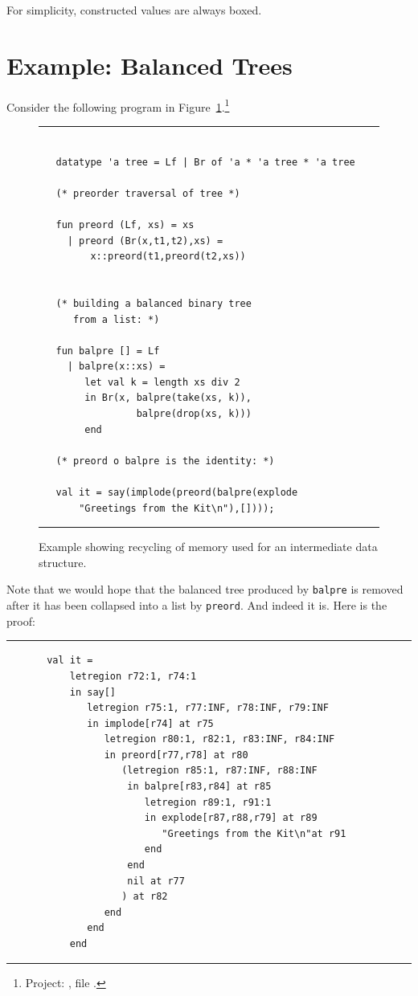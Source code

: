 \documentclass[12pt]{book}
\begin{document}
For simplicity, constructed values are always boxed. 
\section{Example: Balanced Trees}
Consider the following program in
Figure~\ref{balpre.fig}.\footnote{Project: , file
  .}\begin{figure} \hrule
\begin{verbatim}

   datatype 'a tree = Lf | Br of 'a * 'a tree * 'a tree

   (* preorder traversal of tree *)

   fun preord (Lf, xs) = xs
     | preord (Br(x,t1,t2),xs) = 
         x::preord(t1,preord(t2,xs))


   (* building a balanced binary tree
      from a list: *)

   fun balpre [] = Lf
     | balpre(x::xs) = 
        let val k = length xs div 2
        in Br(x, balpre(take(xs, k)),
                 balpre(drop(xs, k)))
        end

   (* preord o balpre is the identity: *)

   val it = say(implode(preord(balpre(explode 
       "Greetings from the Kit\n"),[])));
\end{verbatim}
\caption{Example showing recycling of memory used for an intermediate 
data structure.}
\medskip

\hrule
\label{balpre.fig}
\end{figure}
Note that we would hope that the balanced tree
produced by {\tt balpre} is removed after it
has been collapsed into a list by {\tt preord}.
And indeed it is. Here is the proof:
\bigskip

\hrule
\begin{verbatim}
       val it = 
           letregion r72:1, r74:1 
           in say[] 
              letregion r75:1, r77:INF, r78:INF, r79:INF 
              in implode[r74] at r75 
                 letregion r80:1, r82:1, r83:INF, r84:INF 
                 in preord[r77,r78] at r80 
                    (letregion r85:1, r87:INF, r88:INF 
                     in balpre[r83,r84] at r85 
                        letregion r89:1, r91:1 
                        in explode[r87,r88,r79] at r89 
                           "Greetings from the Kit\n"at r91 
                        end 
                     end 
                     nil at r77
                    ) at r82 
                 end 
              end 
           end 
\end{verbatim}
\bigskip
\end{document}
